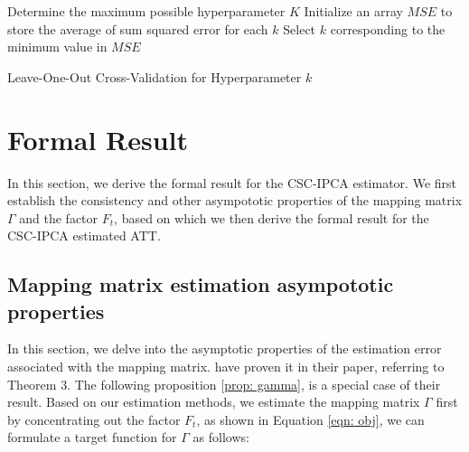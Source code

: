 \documentclass[12pt]{article}
\begin{document}
\begin{algorithm}[!ht]
    \SetAlgoLined
    Determine the maximum possible hyperparameter $K$\;
    Initialize an array $MSE$ to store the average of sum squared error for each $k$\;
      Select $k$ corresponding to the minimum value in $MSE$\;
    \caption{Leave-One-Out Cross-Validation for Hyperparameter $k$}
    \label{algorithm: 2}
\end{algorithm}

\section{Formal Result} 
\label{sec: formal result}
In this section, we derive the formal result for the CSC-IPCA estimator. We first establish the consistency and other asympototic properties of the mapping matrix $\Gamma$ and the factor $F_t$, based on which we then derive the formal result for the CSC-IPCA estimated ATT. 

\subsection{Mapping matrix estimation asympototic properties}
In this section, we delve into the asymptotic properties of the estimation error associated with the mapping matrix. \cite{kelly2020instrumented} have proven it in their paper, referring to Theorem 3. The following proposition \ref{prop: gamma}, is a special case of their result. Based on our estimation methods, we estimate the mapping matrix $\Gamma$ first by concentrating out the factor $F_t$, as shown in Equation \ref{eqn: obj}, we can formulate a target function for $\Gamma$ as follows:
\end{document}
